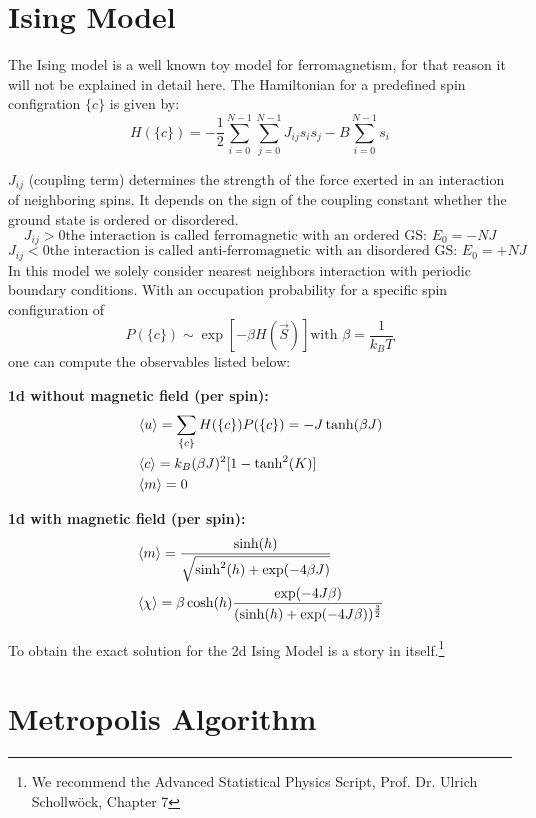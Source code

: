 \documentclass[12pt,a4paper,titlepage]{article}
\begin{document}
\newpage
\section{Ising Model}

The Ising model is a well known toy model for ferromagnetism, for that reason it will not be explained in detail here.
The Hamiltonian for a predefined spin configration $\{c\}$ is given by:
 \[H(\{c\})= - \frac{1}{2}\sum_{i=0}^{N-1} \sum_{j=0}^{N-1} J_{ij} s_i s_j - B \sum_{i=0}^{N-1}s_i\]

$J_{ij}$ (coupling term) determines the strength of the force exerted in an interaction of neighboring spins. It depends on the sign of the coupling constant whether the ground state is ordered or disordered. 
\[J_{ij} > 0 \text{the interaction is called ferromagnetic with an ordered GS: } E_0=-NJ\]
\[J_{ij} < 0 \text{the interaction is called anti-ferromagnetic with an disordered GS: } E_0=+NJ\]
In this model we solely consider nearest neighbors interaction with periodic boundary conditions.
With an occupation probability for a specific spin configuration of
\[P(\{c\}) \sim \exp[-\beta H(\vec{S})] \text{with } \beta = \frac{1}{k_B T}\]
one can compute the observables listed below:\newline

\textbf{1d without magnetic field (per spin):}
\begin{align*}
&\braket{u} = \sum_{\{c\}}H(\{c\})P(\{c\}) = -J \tanh(\beta J)\\
&\braket{c} = k_B(\beta J)^2[1-\tanh^2(K)]\\
&\braket{m} = 0 
\end{align*} 


\textbf{1d with magnetic field (per spin):}
\begin{align*}
&\braket{m} = \frac{\sinh(h)}{\sqrt{\sinh^2(h) + \exp(-4\beta J) }}\\
&\braket{\chi}=\beta \cosh(h) \frac{\exp(-4J\beta)}{(\sinh(h)+\exp(-4J\beta))^{\frac{3}{2}}}
\end{align*}


To obtain the exact solution for the 2d Ising Model is a story in itself.\footnote[1]{We recommend the Advanced Statistical Physics Script,
\newline Prof. Dr. Ulrich Schollw\"ock, Chapter 7}







\section{Metropolis Algorithm}
\end{document}
